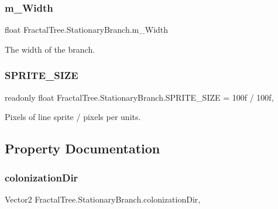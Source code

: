 \subsubsection{\texorpdfstring{m\+\_\+\+Width}{m\_Width}}
{\footnotesize\ttfamily float Fractal\+Tree.\+Stationary\+Branch.\+m\+\_\+\+Width\hspace{0.3cm}{\ttfamily [protected]}}



The width of the branch. 

\hypertarget{class_fractal_tree_1_1_stationary_branch_aa1486b3c67665c24e3fa10eabbb30197}{}\label{class_fractal_tree_1_1_stationary_branch_aa1486b3c67665c24e3fa10eabbb30197} 
\subsubsection{\texorpdfstring{S\+P\+R\+I\+T\+E\+\_\+\+S\+I\+ZE}{SPRITE\_SIZE}}
{\footnotesize\ttfamily readonly float Fractal\+Tree.\+Stationary\+Branch.\+S\+P\+R\+I\+T\+E\+\_\+\+S\+I\+ZE = 100f / 100f\hspace{0.3cm}{\ttfamily [static]}, {\ttfamily [protected]}}



Pixels of line sprite / pixels per units. 



\subsection{Property Documentation}
\hypertarget{class_fractal_tree_1_1_stationary_branch_a723f9bad6ef25d1b3cb215484b7a3e76}{}\label{class_fractal_tree_1_1_stationary_branch_a723f9bad6ef25d1b3cb215484b7a3e76} 
\subsubsection{\texorpdfstring{colonization\+Dir}{colonizationDir}}
{\footnotesize\ttfamily Vector2 Fractal\+Tree.\+Stationary\+Branch.\+colonization\+Dir\hspace{0.3cm}{\ttfamily [get]}, {\ttfamily [set]}}



